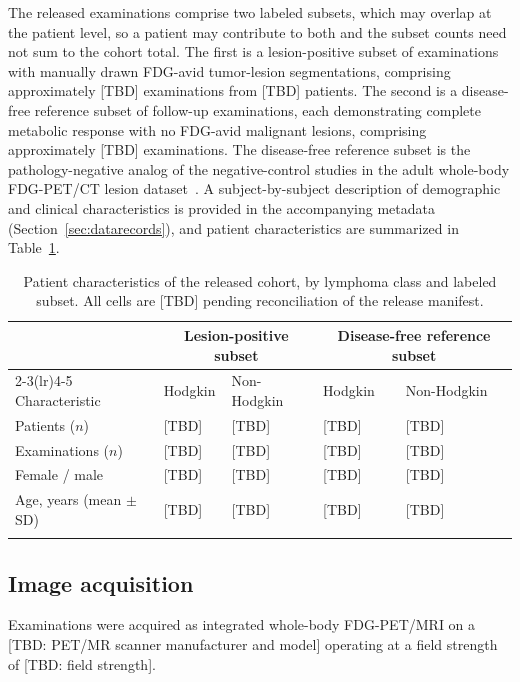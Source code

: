 The released examinations comprise two labeled subsets, which may overlap at the patient level, so a patient may contribute to both and the subset counts need not sum to the cohort total.
The first is a lesion-positive subset of examinations with manually drawn FDG-avid tumor-lesion segmentations, comprising approximately [TBD] examinations from [TBD] patients.
The second is a disease-free reference subset of follow-up examinations, each demonstrating complete metabolic response with no FDG-avid malignant lesions, comprising approximately [TBD] examinations.
The disease-free reference subset is the pathology-negative analog of the negative-control studies in the adult whole-body FDG-PET/CT lesion dataset~\cite{Gatidis_2022}.
A subject-by-subject description of demographic and clinical characteristics is provided in the accompanying metadata (Section~\ref{sec:datarecords}), and patient characteristics are summarized in Table~\ref{tab:cohort}.

\begin{table}[h]
\caption{Patient characteristics of the released cohort, by lymphoma class and labeled subset. All cells are [TBD] pending reconciliation of the release manifest.}\label{tab:cohort}
\begin{tabular}{@{}lllll@{}}
\toprule
 & \multicolumn{2}{c}{Lesion-positive subset} & \multicolumn{2}{c}{Disease-free reference subset} \\
\cmidrule(lr){2-3}\cmidrule(lr){4-5}
Characteristic & Hodgkin & Non-Hodgkin & Hodgkin & Non-Hodgkin \\
\midrule
Patients ($n$)            & [TBD] & [TBD] & [TBD] & [TBD] \\
Examinations ($n$)        & [TBD] & [TBD] & [TBD] & [TBD] \\
Female / male             & [TBD] & [TBD] & [TBD] & [TBD] \\
Age, years (mean $\pm$ SD) & [TBD] & [TBD] & [TBD] & [TBD] \\
\botrule
\end{tabular}
\end{table}

\subsection*{Image acquisition}\label{subsec:acquisition}
Examinations were acquired as integrated whole-body FDG-PET/MRI on a [TBD: PET/MR scanner manufacturer and model] operating at a field strength of [TBD: field strength].

